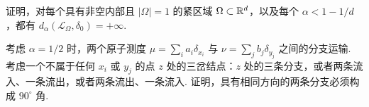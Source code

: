 \begin{exercise}\label{ex:29}
证明，对每个具有非空内部且 $|\Omega|=1$ 的紧区域 $\Omega\subset\mathbb R^d$，以及每个 $\alpha<1-1/d$，都有 $d_\alpha(\mathscr L_\Omega,\delta_0)=+\infty$.
\end{exercise}

\begin{exercise}\label{ex:30}
考虑 $\alpha=1/2$ 时，两个原子测度 $\mu=\sum_i a_i\delta_{x_i}$ 与 $\nu=\sum_j b_j\delta_{y_j}$ 之间的分支运输. 考虑一个不属于任何 $x_i$ 或 $y_j$ 的点 $z$ 处的三岔结点：$z$ 处的三条分支，或者两条流入、一条流出，或者两条流出、一条流入. 证明，具有相同方向的两条分支必须构成 $90^\circ$ 角.
\end{exercise}
